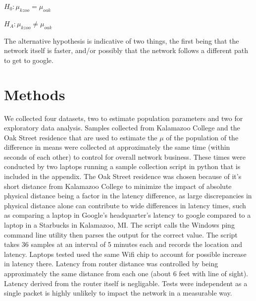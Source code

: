 \documentclass{article}
\begin{document}
\begin{centering}
$H_0: \mu_{kzoo} = \mu_{oak}$ \\
\end{centering}

\begin{centering}
$H_A: \mu_{kzoo} \ne \mu_{oak}$ \\
\end{centering}


The alternative hypothesis is indicative of two things, the first being that the network itself is faster, and/or possibly that the network follows a different path to get to google.
\section{Methods}
We collected four datasets, two to estimate population parameters and two for exploratory data analysis. Samples collected from Kalamazoo College and the Oak Street residence that are used to estimate the $\mu$ of the population of the difference in means were collected at approximately the same time (within seconds of each other) to control for overall network business. These times were conducted by two laptops running a sample collection script in python that is included in the appendix. The Oak Street residence was chosen because of it's short distance from Kalamazoo College to minimize the impact of absolute physical distance being a factor in the latency difference, as large discrepancies in physical distance alone can contribute to wide differences in latency times, such as comparing a laptop in Google's headquarter's latency to google compared to a laptop in a Starbucks in Kalamazoo, MI. The script calls the Windows ping command line utility then parses the output for the correct value. The script takes 36 samples at an interval of 5 minutes each and records the location and latency. Laptops tested used the same Wifi chip to account for possible increase in latency there. Latency from router distance was controlled by being approximately the same distance from each one (about 6 feet with line of sight). Latency derived from the router itself is negligable. Tests were independent as a single packet is highly unlikely to impact the network in a measurable way.
\end{document}
